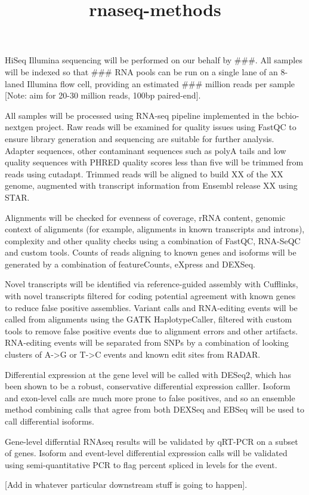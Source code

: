 \documentclass[11pt]{article}
\date{}
\title{rnaseq-methods}
\begin{document}
\maketitle
HiSeq Illumina sequencing will be performed on our behalf by \#\#\#. All
samples will be indexed so that \#\#\# RNA pools can be run on a single
lane of an 8-laned Illumina flow cell, providing an estimated \#\#\#
million reads per sample [Note: aim for 20-30 million reads, 100bp
paired-end].

All samples will be processed using RNA-seq pipeline implemented in
the bcbio-nextgen project. Raw reads will be examined for quality
issues using FastQC to ensure library generation and sequencing are
suitable for further analysis. Adapter sequences, other contaminant
sequences such as polyA tails and low quality sequences with PHRED
quality scores less than five will be trimmed from reads using
cutadapt\cite{Martin:2011va}. Trimmed reads will be aligned to build
XX of the XX genome, augmented with transcript information from
Ensembl release XX using STAR\cite{Dobin:2013fg}.

Alignments will be checked for evenness of coverage, rRNA content,
genomic context of alignments (for example, alignments in known
transcripts and introns), complexity and other quality checks using a
combination of FastQC, RNA-SeQC\cite{DeLuca:2012dp} and custom tools.
Counts of reads aligning to known genes and isoforms will be generated
by a combination of featureCounts\cite{Anonymous:2014cj},
eXpress\cite{Roberts:2013up} and DEXSeq\cite{Anders:2012es}.

Novel transcripts will be identified via reference-guided assembly
with Cufflinks\cite{Trapnell:2010kd},
with novel
transcripts filtered for coding potential agreement\cite{Wang:2013bj}
with known genes to reduce false positive assemblies. Variant calls
and RNA-editing events will be called from alignments using the GATK
HaplotypeCaller, filtered with custom tools to remove false
positive events due to alignment errors and other artifacts.
RNA-editing events will be separated from SNPs by a combination of
looking clusters of A->G or T->C events and known edit sites from
RADAR\cite{Ramaswami:2014hx}.

Differential expression at the gene level will be called with
DESeq2\cite{Love:2014do}, which has been shown to be a robust,
conservative differential expression calller. Isoform and exon-level
calls are much more prone to false positives, and so an ensemble
method combining calls that agree from both DEXSeq and
EBSeq\cite{Leng:2013bk} will be used to call differential isoforms.

Gene-level differntial RNAseq results will be validated by qRT-PCR on
a subset of genes. Isoform and event-level differential expression
calls will be validated using semi-quantitative PCR to flag percent
spliced in levels for the event.

[Add in whatever particular downstream stuff is going to happen].



\end{document}
